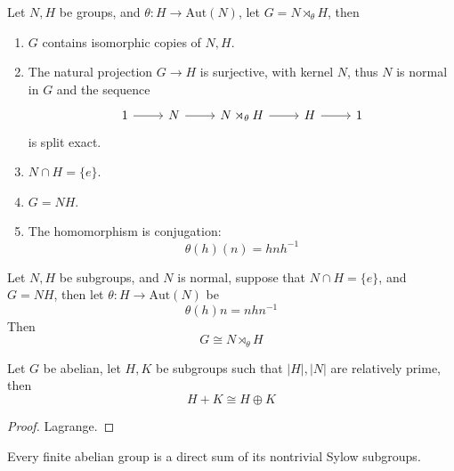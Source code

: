\documentclass[openany]{book}
\begin{document}
\begin{thm}
    Let $N,H$ be groups, and $\theta: H\to\text{Aut}(N)$, let $G=N\rtimes_\theta H$, then 
    \begin{enumerate}
        \item $G$ contains isomorphic copies of $N,H$.
        \item The natural projection $G\to H$ is surjective, with kernel $N$, thus $N$ is normal in $G$ and the sequence 
        \[\begin{tikzcd}
            1 & N & {N\rtimes_\theta H} & H & 1
            \arrow[from=1-1, to=1-2]
            \arrow[from=1-2, to=1-3]
            \arrow[from=1-3, to=1-4]
            \arrow[from=1-4, to=1-5]
        \end{tikzcd}\]
        is split exact.
        \item $N\cap H=\{e\}$.
        \item $G=NH$.
        \item The homomorphism is conjugation: 
        \begin{equation*}
            \theta(h)(n)=hnh^{-1}
        \end{equation*}
    \end{enumerate}
\end{thm}

\begin{prop}
    Let $N,H$ be subgroups, and $N$ is normal, suppose that $N\cap H=\{e\}$, and $G=NH$, then let $\theta: H\to\text{Aut}(N)$ be 
    \begin{equation*}
        \theta(h)n=nhn^{-1}
    \end{equation*}
    Then 
    \begin{equation*}
        G\cong N\rtimes_\theta H
    \end{equation*}
\end{prop}


\begin{prop}
    Let $G$ be abelian, let $H,K$ be subgroups such that $|H|, |N|$ are relatively prime, then 
    \begin{equation*}
        H+K\cong H\oplus K
    \end{equation*}
\end{prop}
\begin{proof}
    Lagrange.
\end{proof}
\begin{prop}
    Every finite abelian group is a direct sum of its nontrivial Sylow subgroups.
\end{prop}
\end{document}

